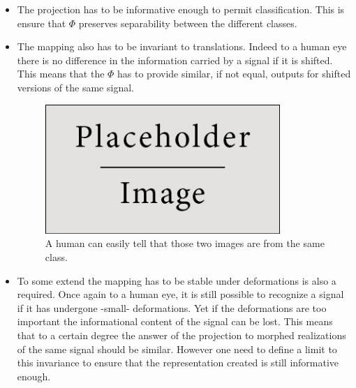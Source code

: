 \documentclass[a4paper,11pt]{report}
\begin{document}
      
			\begin{itemize}
				\item The projection has to be informative enough to permit classification. This is ensure that $\Phi$ preserves separability between the different classes.\\

				\item The mapping also has to be invariant to translations. Indeed to a human eye there is no difference in the information carried by a signal if it is shifted. This means that the $\Phi$ has to provide similar, if not equal, outputs for shifted versions of the same signal.\\
		
				\begin{figure}
				  \begin{center}
				    \includegraphics[width=3.5in]{placeholder.jpg}
				    \caption[Translation invariance]{A human can easily tell that those two images are from the same class.}
				    \label{fig:Illustration translation invariance}
				  \end{center}
				\end{figure}
	
				\item To some extend the mapping has to be stable under deformations is also a required. Once again to a human eye, it is still possible to recognize a signal if it has undergone -small- deformations. Yet if the deformations are too important the informational content of the signal can be lost. This means that to a certain degree the answer of the projection to morphed realizations of the same signal should be similar. However one need to define a limit to this invariance to ensure that the representation created is still informative enough.\\
				

\end{itemize}
\end{document}

